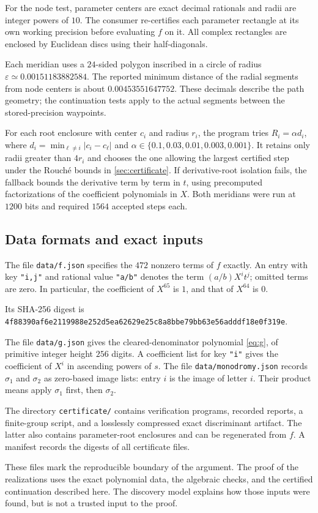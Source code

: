 For the node test, parameter centers are exact decimal rationals and radii
are integer powers of $10$. The consumer re-certifies each parameter
rectangle at its own working precision before evaluating $f$ on it.
All complex rectangles are enclosed by Euclidean discs using their
half-diagonals.

Each meridian uses a $24$-sided polygon inscribed in a circle of radius
$\varepsilon\simeq0.00151183882584$. The reported minimum distance of the
radial segments from node centers is about $0.00453551647752$.
These decimals describe the path geometry; the continuation tests apply
to the actual segments between the stored-precision waypoints.

For each root enclosure with center $c_i$ and radius $r_i$, the program
tries $R_i=\alpha d_i$, where $d_i=\min_{\ell\ne i}|c_i-c_\ell|$ and
$\alpha\in\{0.1,0.03,0.01,0.003,0.001\}$. It retains only radii greater
than $4r_i$ and chooses the one allowing the largest certified step under
the Rouch\'e bounds in \cref{sec:certificate}. If derivative-root isolation
fails, the fallback bounds the derivative term by term in $t$, using
precomputed factorizations of the coefficient polynomials in $X$.
Both meridians were run at $1200$ bits and required $1564$ accepted
steps each.

\subsection{Data formats and exact inputs}\label{app:data}

The file \texttt{data/f.json} specifies the $472$ nonzero terms of $f$
exactly. An entry with key
\texttt{"i,j"} and rational value \texttt{"a/b"} denotes the term
$(a/b)X^i t^j$; omitted terms are zero. In particular, the coefficient
of $X^{65}$ is $1$, and that of $X^{64}$ is $0$.

Its SHA-256 digest is
{\small\texttt{4f88390af6e2119988e252d5ea62629e25c8a8bbe79bb63e56adddf18e0f319e}}.

The file \texttt{data/g.json} gives the cleared-denominator polynomial
\eqref{eq:g}, of primitive integer height $256$ digits. A coefficient list
for key \texttt{"i"} gives the coefficient of $X^i$ in ascending powers
of $s$. The file
\texttt{data/monodromy.json} records $\sigma_1$ and $\sigma_2$ as zero-based
image lists: entry $i$ is the image of letter $i$. Their product means
apply $\sigma_1$ first, then $\sigma_2$.

The directory \texttt{certificate/} contains verification programs,
recorded reports, a finite-group script, and a losslessly compressed exact
discriminant artifact. The latter also contains parameter-root enclosures
and can be regenerated from $f$. A manifest records the digests of all
certificate files.

These files mark the reproducible boundary of the argument. The proof of
the realizations uses the exact polynomial data, the algebraic checks, and
the certified continuation described here. The discovery model explains
how those inputs were found, but is not a trusted input to the proof.
